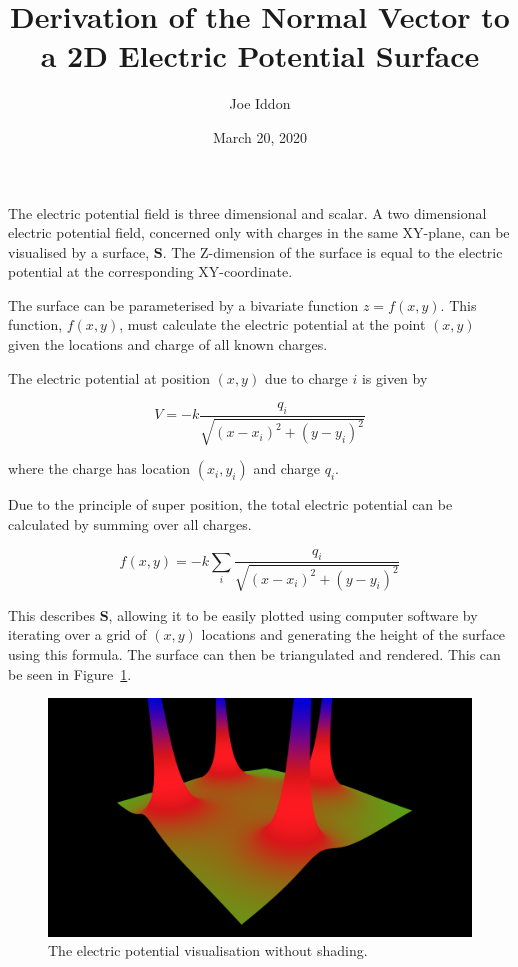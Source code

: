 \documentclass{article} %
\begin{document}
\title{Derivation of the Normal Vector to a 2D Electric Potential Surface}
\author{Joe Iddon}
\date{March 20, 2020}
\maketitle

The electric potential field is three dimensional and scalar. A two dimensional electric potential field, concerned only with charges in the same XY-plane, can be visualised by a surface, $\textbf{S}$. The Z-dimension of the surface is equal to the electric potential at the corresponding XY-coordinate.


The surface can be parameterised by a bivariate function $z = f(x,y)$. This function, $f(x,y)$, must calculate the electric potential at the point $(x,y)$ given the locations and charge of all known charges.

The electric potential at position $(x,y)$ due to charge $i$ is given by

$$V = -k\frac{q_i}{\sqrt{(x-x_i)^2 + (y-y_i)^2}}$$

where the charge has location $(x_i, y_i)$ and charge $q_i$.

Due to the principle of super position, the total electric potential can be calculated by summing over all charges.

$$f(x,y) = -k\sum_{i}\frac{q_i}{\sqrt{(x-x_i)^2 + (y-y_i)^2}}$$

This describes $\textbf{S}$, allowing it to be easily plotted using computer software by iterating over a grid of $(x,y)$ locations and generating the height of the surface using this formula. The surface can then be triangulated and rendered. This can be seen in Figure~\ref{fig:no-shading}.

\begin{figure}
\label{fig:no-shading}
\includegraphics[width=\linewidth]{no_shading.png}
\caption{The electric potential visualisation without shading.}
\end{figure}
\end{document}
